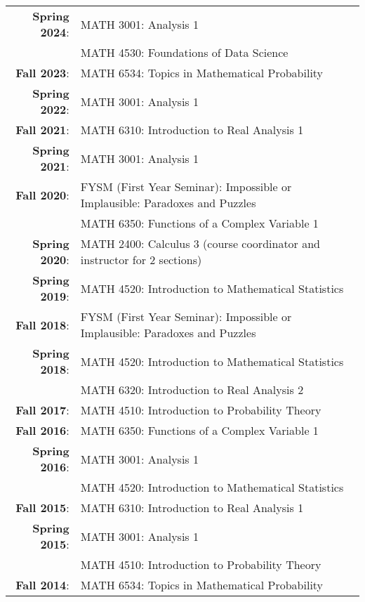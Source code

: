 \documentclass[letterpaper]{article}
\begin{document}
   \begin{tabular}{r l}
   	{\bf Spring 2024}: & MATH 3001: Analysis 1 \\
			& MATH 4530: Foundations of Data Science \\
   	{\bf Fall 2023}: & MATH 6534: Topics in Mathematical Probability \\
   	{\bf Spring 2022}: & MATH 3001: Analysis 1 \\
   	{\bf Fall 2021}: & MATH 6310: Introduction to Real Analysis 1 \\
         {\bf Spring 2021}: & MATH 3001: Analysis 1 \\
   	{\bf Fall 2020}: & FYSM (First Year Seminar): Impossible or Implausible: Paradoxes and Puzzles \\
			     & MATH 6350: Functions of a Complex Variable 1 \\
   	{\bf Spring 2020}: & MATH 2400: Calculus 3 (course coordinator and instructor for $2$ sections)  \\
   	{\bf Spring 2019}: & MATH 4520: Introduction to Mathematical Statistics \\
   	{\bf Fall 2018}: & FYSM (First Year Seminar): Impossible or Implausible: Paradoxes and Puzzles \\
   	{\bf Spring 2018}: & MATH 4520: Introduction to Mathematical Statistics \\
				& MATH 6320: Introduction to Real Analysis 2 \\
   	{\bf Fall 2017}: & MATH 4510: Introduction to Probability Theory \\
   	{\bf Fall 2016}: & MATH 6350: Functions of a Complex Variable 1 \\
   	{\bf Spring 2016}: & MATH 3001: Analysis 1 \\
				& MATH 4520: Introduction to Mathematical Statistics \\
   	{\bf Fall 2015}: & MATH 6310: Introduction to Real Analysis 1 \\
   	{\bf Spring 2015}: & MATH 3001: Analysis 1 \\
				& MATH 4510: Introduction to Probability Theory \\
   	{\bf Fall 2014}: &  MATH 6534: Topics in Mathematical Probability
   \end{tabular}
   
\end{document}
